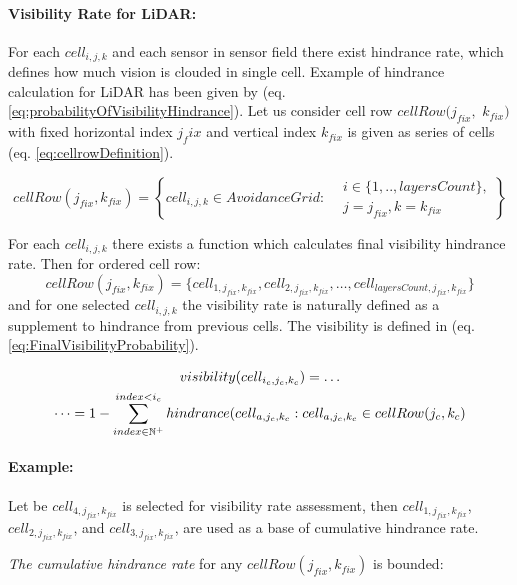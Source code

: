 \paragraph{Visibility Rate for  LiDAR:} For each $cell_{i,j,k}$ and each sensor in sensor field there exist hindrance rate, which defines how much vision is clouded in single cell. Example of hindrance calculation for LiDAR has been given by (eq. \ref{eq:probabilityOfVisibilityHindrance}). Let us consider cell row $cell Row (j_{fix},$ $k_{fix})$ with fixed horizontal index $j_fix$ and vertical index $k_{fix}$ is given as series of cells (eq. \ref{eq:cellrowDefinition}).

\begin{equation}\label{eq:cellrowDefinition}
    cellRow(j_{fix},k_{fix})= \left\{cell_{i,j,k}\in Avoidance Grid :\begin{aligned}&i\in\{1,..,layersCount\},\\&j=j_{fix}, k=k_{fix}\end{aligned}\right\}
\end{equation}

For each $cell_{i,j,k}$ there exists a function which calculates final visibility hindrance rate. Then for ordered cell row:
\begin{equation*}
    cell Row(j_{fix},k_{fix}) = \{cell_{1,j_{fix},k_{fix}},  cell_{2,j_{fix},k_{fix}}, \dots, cell_{layers Count,j_{fix},k_{fix}}\}    
\end{equation*}
and for one selected $cell_{i,j,k}$ the visibility rate is naturally defined as a supplement to hindrance from previous cells. The visibility is defined in (eq. \ref{eq:FinalVisibilityProbability}).

\begin{multline}\label{eq:FinalVisibilityProbability}
    visibility(cell_{i_c,j_c,k_c})=\dots\\ \dots =1 - \sum_{index\in\mathbb{N}^+}^{index < i_c} hindrance(cell_{a,j_c,k_c}: cell_{a,j_c,k_c}\in cell Row(j_{c},k_{c})
\end{multline}

\paragraph{Example:} Let be $cell_{4,j_{fix},k_{fix}}$ is selected for visibility rate assessment, then $cell_{1,j_{fix},k_{fix}}$, $cell_{2,j_{fix},k_{fix}}$, and $cell_{3,j_{fix},k_{fix}}$, are used as a base of cumulative hindrance rate.

\noindent \emph{The cumulative hindrance rate} for any $cell Row(j_{fix},k_{fix})$ is bounded:

